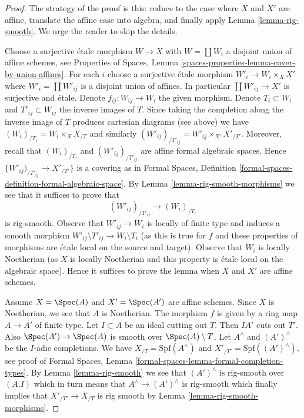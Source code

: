 \begin{proof}
The strategy of the proof is this: reduce to the case where $X$ and $X'$
are affine, translate the affine case into algebra, and finally apply
Lemma \ref{lemma-rig-smooth}. We urge the reader to skip the details.

\medskip\noindent
Choose a surjective \'etale morphism $W \to X$ with $W = \coprod W_i$
a disjoint union of affine schemes, see Properties of Spaces, Lemma
\ref{spaces-properties-lemma-cover-by-union-affines}.
For each $i$ choose a surjective \'etale morphism $W'_i \to W_i \times_X X'$
where $W'_i = \coprod W'_{ij}$ is a disjoint union of affines.
In particular $\coprod W'_{ij} \to X'$ is surjective and \'etale.
Denote $f_{ij} : W_{ij} \to W_i$ the given morphism.
Denote $T_i \subset W_i$ and $T'_{ij} \subset W_{ij}$ the inverse
images of $T$. Since taking the completion along the inverse
image of $T$ produces cartesian diagrams (see above) we
have $(W_i)_{/T_i} = W_i \times_X X_{/T}$ and similarly
$(W'_{ij})_{/T'_{ij}} = W'_{ij} \times_{X'} X'_{/T'}$.
Moreover, recall that $(W_i)_{/T_i}$ and $(W'_{ij})_{/T'_{ij}}$
are affine formal algebraic spaces.
Hence $\{W'_{ij})_{/T'_{ij}} \to X'_{/T'}\}$ is a covering
as in Formal Spaces, Definition
\ref{formal-spaces-definition-formal-algebraic-space}.
By Lemma \ref{lemma-rig-smooth-morphisms}
we see that it suffices to prove that
$$
(W'_{ij})_{/T'_{ij}} \longrightarrow (W_i)_{/T_i}
$$
is rig-smooth. Observe that $W'_{ij} \to W_i$
is locally of finite type and induces a smooth morphism
$W'_{ij} \setminus T'_{ij} \to W_i \setminus T_i$
(as this is true for $f$ and these properties of morphisms are
\'etale local on the source and target).
Observe that $W_i$ is locally Noetherian (as $X$ is locally Noetherian
and this property is \'etale local on the algebraic space).
Hence it suffices to prove the lemma when
$X$ and $X'$ are affine schemes.

\medskip\noindent
Assume $X = \Spec(A)$ and $X' = \Spec(A')$ are affine schemes.
Since $X$ is Noetherian, we see that $A$ is Noetherian.
The morphism $f$ is given by a ring map $A \to A'$ of finite type.
Let $I \subset A$ be an ideal cutting out $T$. Then $IA'$ cuts out $T'$.
Also $\Spec(A') \to \Spec(A)$ is smooth over $\Spec(A) \setminus T$.
Let $A^\wedge$ and $(A')^\wedge$ be the $I$-adic
completions. We have $X_{/T} = \text{Spf}(A^\wedge)$ and
$X'_{/T'} = \text{Spf}((A')^\wedge)$, see proof of
Formal Spaces, Lemma
\ref{formal-spaces-lemma-formal-completion-types}.
By Lemma \ref{lemma-rig-smooth} we see that
$(A')^\wedge$ is rig-smooth over $(A. I)$
which in turn means that $A^\wedge \to (A')^\wedge$ is rig-smooth which
finally implies that $X'_{/T'} \to X_{/T}$ is rig smooth by
Lemma \ref{lemma-rig-smooth-morphisms}.
\end{proof}

